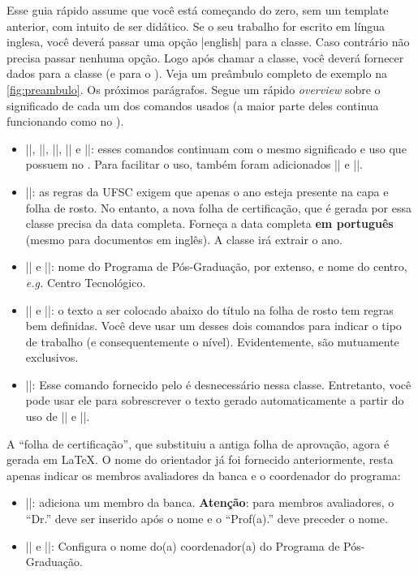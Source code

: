 \documentclass[embeddedlogo]{../ufsc-thesis-rn46-2019}
\begin{document}
Esse guia rápido assume que você está começando do zero, sem um template
anterior, com intuito de ser didático. Se o seu trabalho for escrito em língua
inglesa, você deverá passar uma opção \mt|english| para a classe. Caso
contrário não precisa passar nenhuma opção. Logo após chamar a classe, você
deverá fornecer dados para a classe (e para o \abnTeX). Veja um preâmbulo
completo de exemplo na \autoref{fig:preambulo}. Os próximos parágrafos. Segue
um rápido \emph{overview} sobre o significado de cada um dos comandos usados (a maior
parte deles continua funcionando como no \abnTeX).

\begin{itemize}
  \item \mt|\titulode|, \mt|\autor|, \mt|\instituicao|, \mt|\orientador| e
      \mt|\coorientador|: esses comandos continuam com o mesmo significado e
        uso que possuem no \abnTeX. Para facilitar o uso, também foram
        adicionados \mt|\orientadora| e \mt|\coorientadora|.
  \item \mt|\data|: as regras da UFSC exigem que apenas o ano esteja presente
      na capa e folha de rosto. No entanto, a nova folha de certificação, que é
        gerada por essa classe precisa da data completa. Forneça a data
        completa \textbf{em português} (mesmo para documentos em inglês). A
        classe irá extrair o ano.
  \item \mt|\programa| e \mt|\centro|: nome do Programa de Pós-Graduação, por
      extenso, e nome do centro, \emph{e.g.} Centro Tecnológico.
  \item \mt|\tese| e \mt|\dissertacao|: o texto a ser colocado abaixo do título
      na folha de rosto tem regras bem definidas. Você deve usar um desses dois
        comandos para indicar o tipo de trabalho (e consequentemente o nível).
        Evidentemente, são mutuamente exclusivos.
  \item \mt|\preambulo|: Esse comando fornecido pelo \abnTeX{} é desnecessário
      nessa classe. Entretanto, você pode usar ele para sobrescrever o texto
        gerado automaticamente a partir do uso de \mt|\tese| e \mt|\titulode|.
\end{itemize}

A ``folha de certificação'', que substituiu a antiga folha de aprovação, agora
é gerada em \LaTeX. O nome do orientador já foi fornecido anteriormente, resta
apenas indicar os membros avaliadores da banca e o coordenador do programa:
\begin{itemize}
  \item \mt||: adiciona um membro da banca.
      \textbf{Atenção}: para membros avaliadores, o ``Dr.'' deve ser inserido
        após o nome e o ``Prof(a).'' deve preceder o nome.
  \item \mt|\coordenador| e \mt|\coordenadora|: Configura o nome do(a)
      coordenador(a) do Programa de Pós-Graduação.
\end{itemize}
\end{document}
